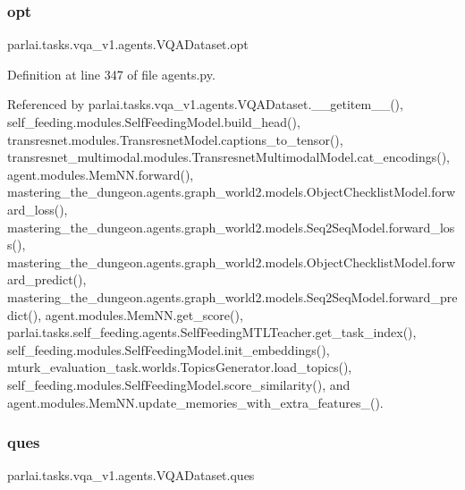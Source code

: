 \subsubsection{\texorpdfstring{opt}{opt}}
{\footnotesize\ttfamily parlai.\+tasks.\+vqa\+\_\+v1.\+agents.\+V\+Q\+A\+Dataset.\+opt}



Definition at line 347 of file agents.\+py.



Referenced by parlai.\+tasks.\+vqa\+\_\+v1.\+agents.\+V\+Q\+A\+Dataset.\+\_\+\+\_\+getitem\+\_\+\+\_\+(), self\+\_\+feeding.\+modules.\+Self\+Feeding\+Model.\+build\+\_\+head(), transresnet.\+modules.\+Transresnet\+Model.\+captions\+\_\+to\+\_\+tensor(), transresnet\+\_\+multimodal.\+modules.\+Transresnet\+Multimodal\+Model.\+cat\+\_\+encodings(), agent.\+modules.\+Mem\+N\+N.\+forward(), mastering\+\_\+the\+\_\+dungeon.\+agents.\+graph\+\_\+world2.\+models.\+Object\+Checklist\+Model.\+forward\+\_\+loss(), mastering\+\_\+the\+\_\+dungeon.\+agents.\+graph\+\_\+world2.\+models.\+Seq2\+Seq\+Model.\+forward\+\_\+loss(), mastering\+\_\+the\+\_\+dungeon.\+agents.\+graph\+\_\+world2.\+models.\+Object\+Checklist\+Model.\+forward\+\_\+predict(), mastering\+\_\+the\+\_\+dungeon.\+agents.\+graph\+\_\+world2.\+models.\+Seq2\+Seq\+Model.\+forward\+\_\+predict(), agent.\+modules.\+Mem\+N\+N.\+get\+\_\+score(), parlai.\+tasks.\+self\+\_\+feeding.\+agents.\+Self\+Feeding\+M\+T\+L\+Teacher.\+get\+\_\+task\+\_\+index(), self\+\_\+feeding.\+modules.\+Self\+Feeding\+Model.\+init\+\_\+embeddings(), mturk\+\_\+evaluation\+\_\+task.\+worlds.\+Topics\+Generator.\+load\+\_\+topics(), self\+\_\+feeding.\+modules.\+Self\+Feeding\+Model.\+score\+\_\+similarity(), and agent.\+modules.\+Mem\+N\+N.\+update\+\_\+memories\+\_\+with\+\_\+extra\+\_\+features\+\_\+().

\mbox{\label{classparlai_1_1tasks_1_1vqa__v1_1_1agents_1_1VQADataset_a1c5d9762b63c5cf100fe7cbf5c23e68e}} 
\subsubsection{\texorpdfstring{ques}{ques}}
{\footnotesize\ttfamily parlai.\+tasks.\+vqa\+\_\+v1.\+agents.\+V\+Q\+A\+Dataset.\+ques}




